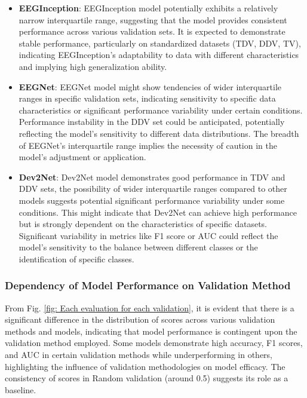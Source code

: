     \begin{itemize}
        \vspace{1mm}
      \item \textbf{EEGInception}: EEGInception model potentially exhibits a relatively narrow interquartile range, suggesting that the model provides consistent performance across various validation sets. It is expected to demonstrate stable performance, particularly on standardized datasets (TDV, DDV, TV), indicating EEGInception's adaptability to data with different characteristics and implying high generalization ability.
      \vspace{3mm}
      \item \textbf{EEGNet}: EEGNet model might show tendencies of wider interquartile ranges in specific validation sets, indicating sensitivity to specific data characteristics or significant performance variability under certain conditions. Performance instability in the DDV set could be anticipated, potentially reflecting the model's sensitivity to different data distributions. The breadth of EEGNet's interquartile range implies the necessity of caution in the model's adjustment or application.
      \vspace{3mm}
      \item \textbf{Dev2Net}: Dev2Net model demonstrates good performance in TDV and DDV sets, the possibility of wider interquartile ranges compared to other models suggests potential significant performance variability under some conditions. This might indicate that Dev2Net can achieve high performance but is strongly dependent on the characteristics of specific datasets. Significant variability in metrics like F1 score or AUC could reflect the model's sensitivity to the balance between different classes or the identification of specific classes.
    \end{itemize}


    \subsubsection{Dependency of Model Performance on Validation Method}

    From Fig. \ref{fig: Each evaluation  for each validation}, it is evident that there is a significant difference in the distribution of scores across various validation methods and models, indicating that model performance is contingent upon the validation method employed. Some models demonstrate high accuracy, F1 scores, and AUC in certain validation methods while underperforming in others, highlighting the influence of validation methodologies on model efficacy. The consistency of scores in Random validation (around 0.5) suggests its role as a baseline.

